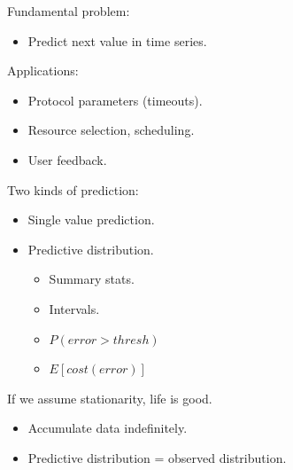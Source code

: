 \documentclass[pdf,allen]{prosper}
\title{}
\author{Changepoint detection in network measurements}
\begin{document}
\maketitle

\begin{slide}{}

Fundamental problem: 

\begin{itemize}

\item Predict next value in time series.

\end{itemize}

Applications:

\begin{itemize}

\item Protocol parameters (timeouts).

\item Resource selection, scheduling.

\item User feedback.

\end{itemize}


\end{slide}

\begin{slide}{}

Two kinds of prediction:

\begin{itemize}

\item Single value prediction.

\item Predictive distribution.

    \begin{itemize}

    \item Summary stats.
    \item Intervals.
    \item $P(error > thresh)$
    \item $E[cost(error)]$

    \end{itemize}


\end{itemize}


\end{slide}

\begin{slide}{}

If we assume stationarity, life is good.

\begin{itemize}

\item Accumulate data indefinitely.

\item Predictive distribution = observed distribution.

\end{itemize}


\end{slide}
\end{document}
